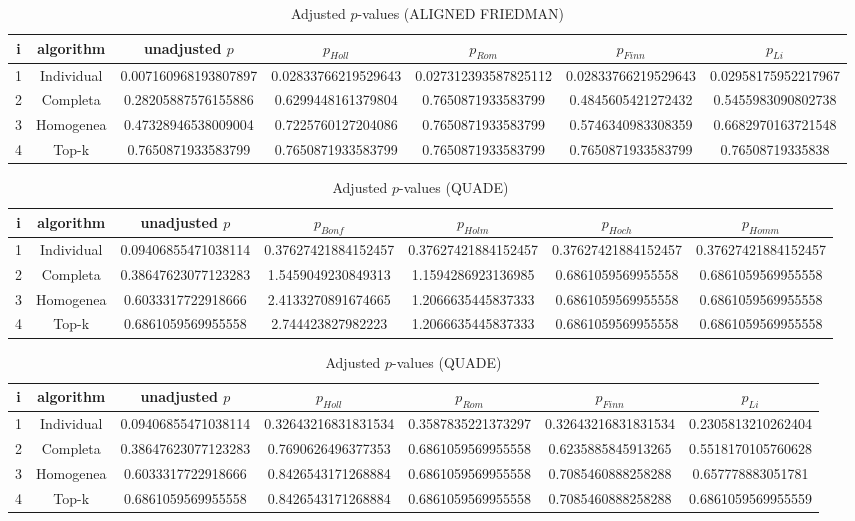 \documentclass[a4paper,10pt]{article}
\begin{document}
\begin{landscape}
\begin{table}[!htp]
\centering\scriptsize
\caption{Adjusted $p$-values (ALIGNED FRIEDMAN)}
\begin{tabular}{ccccccc}
i&algorithm&unadjusted $p$&$p_{Holl}$&$p_{Rom}$&$p_{Finn}$&$p_{Li}$\\
\hline
1&Individual&0.007160968193807897&0.02833766219529643&0.027312393587825112&0.02833766219529643&0.02958175952217967\\
2&Completa&0.28205887576155886&0.6299448161379804&0.7650871933583799&0.4845605421272432&0.5455983090802738\\
3&Homogenea&0.47328946538009004&0.7225760127204086&0.7650871933583799&0.5746340983308359&0.6682970163721548\\
4&Top-k&0.7650871933583799&0.7650871933583799&0.7650871933583799&0.7650871933583799&0.76508719335838\\
\hline
\end{tabular}
\end{table}


\newpage

\begin{table}[!htp]
\centering\scriptsize
\caption{Adjusted $p$-values (QUADE)}
\begin{tabular}{ccccccc}
i&algorithm&unadjusted $p$&$p_{Bonf}$&$p_{Holm}$&$p_{Hoch}$&$p_{Homm}$\\
\hline
1&Individual&0.09406855471038114&0.37627421884152457&0.37627421884152457&0.37627421884152457&0.37627421884152457\\
2&Completa&0.38647623077123283&1.5459049230849313&1.1594286923136985&0.6861059569955558&0.6861059569955558\\
3&Homogenea&0.6033317722918666&2.4133270891674665&1.2066635445837333&0.6861059569955558&0.6861059569955558\\
4&Top-k&0.6861059569955558&2.744423827982223&1.2066635445837333&0.6861059569955558&0.6861059569955558\\
\hline
\end{tabular}
\end{table}

\begin{table}[!htp]
\centering\scriptsize
\caption{Adjusted $p$-values (QUADE)}
\begin{tabular}{ccccccc}
i&algorithm&unadjusted $p$&$p_{Holl}$&$p_{Rom}$&$p_{Finn}$&$p_{Li}$\\
\hline
1&Individual&0.09406855471038114&0.32643216831831534&0.3587835221373297&0.32643216831831534&0.2305813210262404\\
2&Completa&0.38647623077123283&0.7690626496377353&0.6861059569955558&0.6235885845913265&0.5518170105760628\\
3&Homogenea&0.6033317722918666&0.8426543171268884&0.6861059569955558&0.7085460888258288&0.657778883051781\\
4&Top-k&0.6861059569955558&0.8426543171268884&0.6861059569955558&0.7085460888258288&0.6861059569955559\\
\hline
\end{tabular}
\end{table}

\end{landscape}
\end{document}
